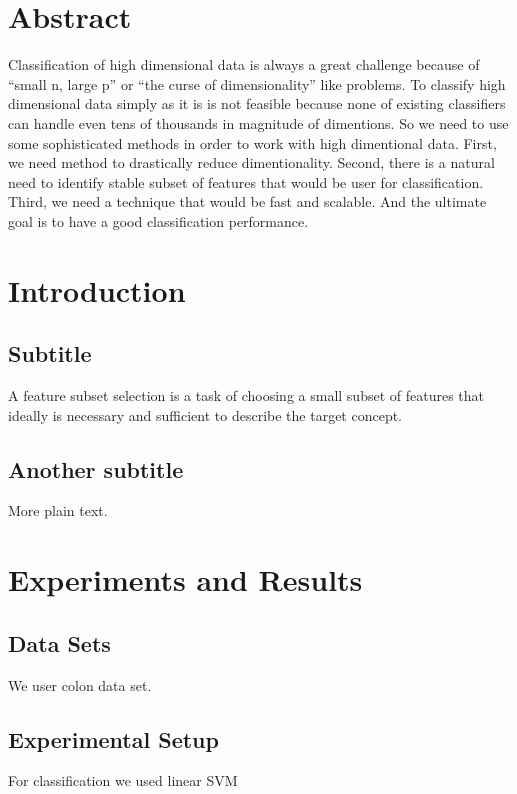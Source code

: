\documentclass{article}
\begin{document}
\section*{Abstract}
Classification of high dimensional data is always a great challenge because of
``small n, large p'' or ``the curse of dimensionality'' like problems.
To classify high dimensional data simply as it is is not feasible because
none of existing classifiers can handle even tens of thousands in magnitude of
dimentions. So we need to use some sophisticated methods in order to work with
high dimentional data. First, we need method to drastically reduce dimentionality.
Second, there is a natural need to identify stable subset of features that would be
user for classification. Third, we need a technique that would be fast and
scalable. And the ultimate goal is to have a good classification performance. 

\section{Introduction}
\subsection{Subtitle}

A feature subset selection is a task of choosing a small subset of
features that ideally is necessary and sufficient to describe the target concept.

\subsection{Another subtitle}

More plain text.

\section{Experiments and Results}

\subsection{Data Sets}

We user colon data set.

\subsection{Experimental Setup}

For classification we used linear SVM
\end{document}

